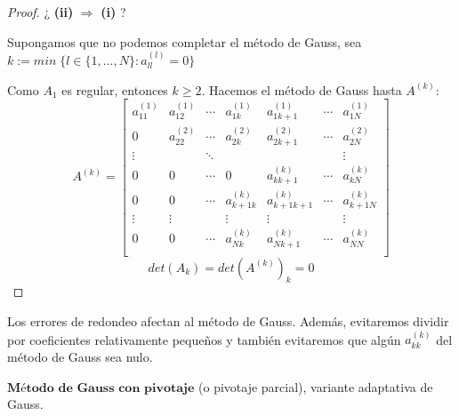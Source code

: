 \begin{nlist}
\begin{proof}
	¿ \textbf{(ii)} $\Rightarrow$ \textbf{(i)} ?
	
	Supongamos que no podemos completar el método de Gauss, sea $k := min \; \lbrace l \in \lbrace 1,...,N \rbrace : a_{ll}^{(l)} = 0 \rbrace$
	
	Como $A_1$ es regular, entonces $k \geq 2$. Hacemos el método de Gauss hasta $A^{(k)}$:
	\[ A^{(k)} = \begin{bmatrix}
a_{11}^{(1)} & a_{12}^{(1)} & \cdots & a_{1k}^{(1)} & a_{1k+1}^{(1)} & \cdots & a_{1N}^{(1)} \\
0 & a_{22}^{(2)} & \cdots & a_{2k}^{(2)} & a_{2k+1}^{(2)} & \cdots & a_{2N}^{(2)} \\
\vdots & & \ddots & & & & \vdots \\
0 & 0 & \cdots & 0 & a_{kk+1}^{(k)} & \cdots & a_{kN}^{(k)} \\
0 & 0 & \cdots & a_{k+1k}^{(k)} &a_{k+1k+1}^{(k)}  & \cdots & a_{k+1N}^{(k)} \\
\vdots & \vdots & & \vdots & \vdots & & \vdots \\
0 & 0 & \cdots & a_{Nk}^{(k)} & a_{Nk+1}^{(k)} & \cdots & a_{NN}^{(k)}\\
\end{bmatrix}\]
	\[ det(A_k) = det(A^{(k)})_k = 0 \]
	\end{proof}
			
Los errores de redondeo afectan al método de Gauss. Además, evitaremos dividir por coeficientes relativamente pequeños y también evitaremos que algún $a_{kk}^{(k)}$ del método de Gauss sea nulo.

\item $\textbf{Método de Gauss con pivotaje}$ (o pivotaje parcial), variante adaptativa de Gauss.


\end{nlist}
